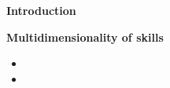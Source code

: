 \begin{frame}\begin{center}
	\LARGE\textbf{Introduction}
\end{center}\end{frame}
\begin{frame}\textbf{Multidimensionality of skills}\vspace{0.3cm}

\begin{itemize}
\item {}
\item {}
\end{itemize}

\end{frame}
{
}
{
}
